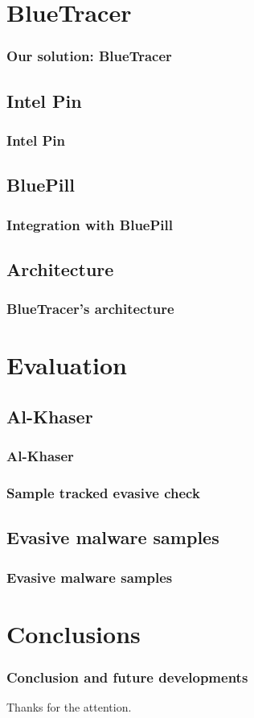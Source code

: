 \documentclass[compress]{beamer}
\begin{document}
\section{BlueTracer}

\begin{frame}
    \frametitle{Our solution: BlueTracer}
	

\end{frame}

\subsection{Intel Pin}

\begin{frame}
    \frametitle{Intel Pin}
	

\end{frame}

\subsection{BluePill}

\begin{frame}
    \frametitle{Integration with BluePill}
	

\end{frame}

\subsection{Architecture}

\begin{frame}
    \frametitle{BlueTracer's architecture}
	

\end{frame}

\section{Evaluation}

\subsection{Al-Khaser}
\begin{frame}
    \frametitle{Al-Khaser}
	

\end{frame}

\begin{frame}
    \frametitle{Sample tracked evasive check}
	

\end{frame}

\subsection{Evasive malware samples}
\begin{frame}
    \frametitle{Evasive malware samples}
	

\end{frame}

\section{Conclusions}

\begin{frame}
    \frametitle{Conclusion and future developments}
	

\end{frame}

\begin{frame}
	Thanks for the attention.
\end{frame}
\end{document}
